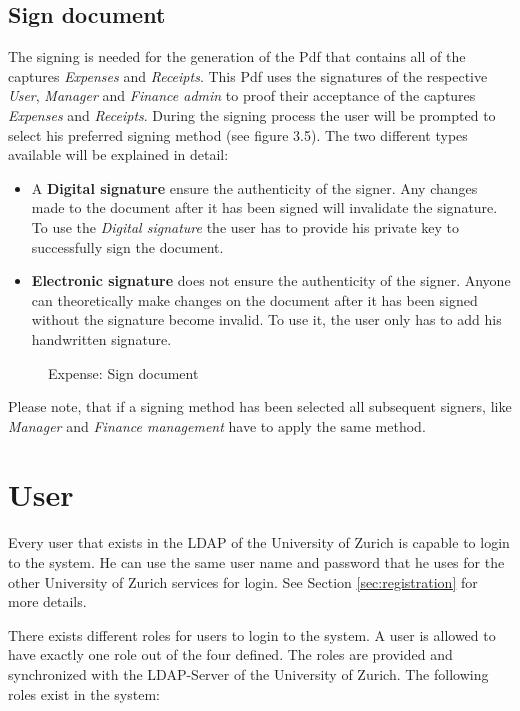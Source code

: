 \subsection{Sign document}
\label{sec:signing}
The signing is needed for the generation of the Pdf that contains all of the captures \textit{Expenses} and \textit{Receipts}. This Pdf uses the signatures of the respective \textit{User}, \textit{Manager} and \textit{Finance admin} to proof their acceptance of the captures \textit{Expenses} and \textit{Receipts}. During the signing process the user will be prompted to select his preferred signing method (see figure 3.5). The two different types available will be explained in detail:
    \begin{itemize}
        \item A \textbf{Digital signature} ensure the authenticity of the signer. Any changes made to the document after it has been signed will invalidate the signature. To use the \textit{Digital signature} the user has to provide his private key to successfully sign the document.
        \item \textbf{Electronic signature} does not ensure the authenticity of the signer. Anyone can theoretically make changes on the document after it has been signed without the signature become invalid. To use it, the user only has to add his handwritten signature.
    \end{itemize}
    
\begin{figure}[H]
    \centering
    \caption{Expense: Sign document}
    \label{fig:expense-sign}
\end{figure}

Please note, that if a signing method has been selected all subsequent signers, like \textit{Manager} and \textit{Finance management} have to apply the same method.


\section{User}

Every user that exists in the LDAP of the University of Zurich is capable to login to the system. He can use the same user name and password that he uses for the other University of Zurich services for login. See Section \ref{sec:registration} for more details.

There exists different roles for users to login to the system. A user is allowed to have exactly one role out of the four defined. The roles are provided and synchronized with the LDAP-Server of the University of Zurich. The following roles exist in the system:

